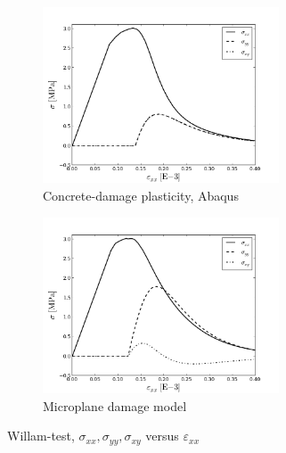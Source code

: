 \documentclass[main.tex]{subfiles}
\begin{document}
\begin{figure} 
    \centering
    \begin{subfigure}[b]{0.4\textwidth}
        \includegraphics[width=7cm]{fig/WillamTest-Sig-Eps11-CDP.png}
        \caption{Concrete-damage plasticity, Abaqus}
        \label{FIGWillamTestSigEps}
    \end{subfigure}
    \begin{subfigure}[b]{0.4\textwidth}
        \includegraphics[width=7cm]{fig/WillamTest-Sig-Eps11-MDM.png}
        \caption{Microplane damage model}
        \label{FIGWillamTestSigEps}
    \end{subfigure}
    \caption{Willam-test, $\sigma_{xx}, \sigma_{yy}, \sigma_{xy}$ versus $\varepsilon_{xx}$}
\end{figure}
\end{document}

